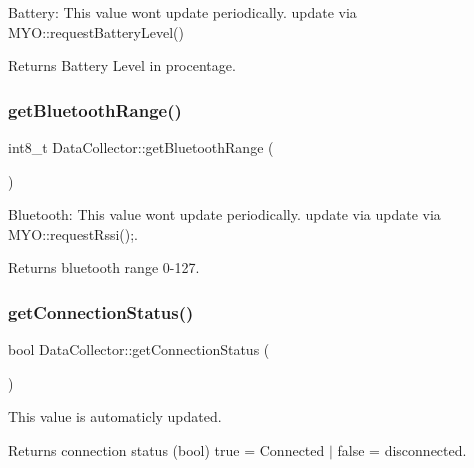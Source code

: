 Battery\+: This value wont update periodically. update via M\+Y\+O\+::request\+Battery\+Level() 

\begin{DoxyReturn}{Returns}
Battery Level in procentage. 
\end{DoxyReturn}
\mbox{\label{class_data_collector_a4992b2e777defed813c7ce15a73bc84b}} 
\subsubsection{\texorpdfstring{get\+Bluetooth\+Range()}{getBluetoothRange()}}
{\footnotesize\ttfamily int8\+\_\+t Data\+Collector\+::get\+Bluetooth\+Range (\begin{DoxyParamCaption}{ }\end{DoxyParamCaption})\hspace{0.3cm}{\ttfamily [inline]}}



Bluetooth\+: This value wont update periodically. update via update via M\+Y\+O\+::request\+Rssi();. 

\begin{DoxyReturn}{Returns}
bluetooth range 0-\/127. 
\end{DoxyReturn}
\mbox{\label{class_data_collector_a2dbac95176fb77c1714573e41ba4490f}} 
\subsubsection{\texorpdfstring{get\+Connection\+Status()}{getConnectionStatus()}}
{\footnotesize\ttfamily bool Data\+Collector\+::get\+Connection\+Status (\begin{DoxyParamCaption}{ }\end{DoxyParamCaption})\hspace{0.3cm}{\ttfamily [inline]}}



This value is automaticly updated. 

\begin{DoxyReturn}{Returns}
connection status (bool) true = Connected $\vert$ false = disconnected. 
\end{DoxyReturn}
\mbox{\label{class_data_collector_a6994bc51d1e7cbcaeca954a4ba7f8103}} 
